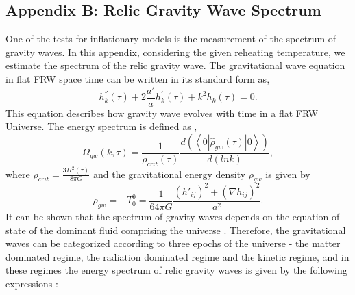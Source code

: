 \documentclass[prd,twocolumn,superscriptaddress]{revtex4}
\begin{document}
\begin{appendices}
 \vspace{.5cm}
 \chapter{\hspace{.2cm}\bf Appendix B: Relic Gravity Wave Spectrum} \label{appxB}
\vspace{.5cm}
One of the tests for inflationary models is the measurement of the spectrum of gravity waves. In this appendix, considering the given
reheating temperature, we estimate the spectrum of the relic gravity wave.  The gravitational wave equation in flat FRW space time can be written  in its standard form 
as,
\begin{equation}
h^{''}_k (\tau) + 2 \frac{a'}{a} h^{'}_{k} (\tau) + k^2 h_k (\tau) = 0.
\end{equation}
This equation describes how gravity wave  evolves with time in a flat FRW Universe. The energy spectrum is defined as \cite{Boyle:2005se},
\begin{equation}
\Omega_{gw} (k, \tau) = \frac{1}{\rho_{crit} (\tau)} 
\frac{d \left( \left< 0 \left| \hat{\rho}_{gw} (\tau) \right| 0 \right> \right)}{ d \left( ln k \right)},
\end{equation}
where $\rho_{crit} = \frac{3 H^2 (\tau)}{8 \pi G}$ and the gravitational energy density $\rho_{gw}$ is given by
\begin{equation}
\rho_{gw} = - T^{0}_{0} = \frac{1}{64 \pi G} 
\frac{{\left( h'_{ij} \right)}^2 + {\left( \nabla h_{ij} \right)}^2}{a^2}.
\end{equation}
It can be shown that the spectrum of gravity waves depends on the  equation of state of the dominant fluid comprising the universe \cite{RGWBISamiSahni,Boyle:2005se}. 
Therefore, the gravitational waves can be categorized according to  three epochs of the universe -  the matter dominated regime,
the radiation dominated regime and the kinetic regime, and in these regimes the energy spectrum of relic gravity waves is given by the following expressions \cite{RGWBISamiSahni}:


\end{appendices}
\end{document}
